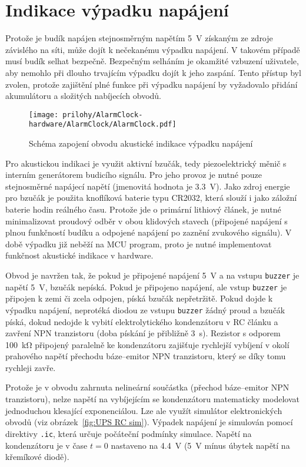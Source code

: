 \section{Indikace výpadku napájení}
Protože je budík napájen stejnosměrným napětím \SI{5}{\volt} získaným ze zdroje
závislého na síti, může dojít k nečekanému výpadku napájení. V takovém případě
musí budík selhat bezpečně. Bezpečným selháním je okamžité vzbuzení uživatele,
aby nemohlo při dlouho trvajícím výpadku dojít k jeho zaspání. Tento přístup
byl zvolen, protože zajištění plné funkce při výpadku napájení by vyžadovalo
přidání akumulátoru a složitých nabíjecích obvodů.

\begin{figure}
    \centering
    \texttt{[image: prilohy/AlarmClock-hardware/AlarmClock/AlarmClock.pdf]}
    \par\bigskip
    \caption{Schéma zapojení obvodu akustické indikace výpadku napájení}
    \label{fig:UPS sch}
\end{figure}

Pro akustickou indikaci je využit aktivní bzučák, tedy piezoelektrický měnič
s interním generátorem budicího signálu. Pro jeho provoz je nutné pouze
stejnosměrné napájecí napětí (jmenovitá hodnota je \SI{3,3}{\volt}).
Jako zdroj energie pro bzučák je použita knoflíková baterie typu CR2032, která
slouží i jako záložní baterie hodin reálného času. Protože jde o primární
lithiový článek, je nutné minimalizovat proudový odběr v obou klidových
stavech (připojené napájení s plnou funkčností budíku a odpojené napájení po
zaznění zvukového signálu). V době výpadku již neběží na \acs{MCU} program,
proto je nutné implementovat funkčnost akustické indikace v hardware.

Obvod je navržen tak, že pokud je připojené napájení \SI{5}{\volt} a na vstupu
\texttt{buzzer} je napětí \SI{5}{\volt}, bzučák nepíská. Pokud je připojeno
napájení, ale vstup \texttt{buzzer} je připojen k zemi či zcela odpojen, píská
bzučák nepřetržitě. Pokud dojde k výpadku napájení, neprotéká diodou ze vstupu
\texttt{buzzer} žádný proud a bzučák píská, dokud nedojde k vybití
elektrolytického kondenzátoru v RC článku a zavření NPN tranzistoru (doba
pískání je přibližně \SI{3}{\second}). Rezistor s odporem \SI{100}{\kilo\ohm}
připojený paralelně ke kondenzátoru zajišťuje rychlejší vybíjení v okolí
prahového napětí přechodu báze--emitor NPN tranzistoru, který se díky tomu
rychleji zavře.

Protože je v obvodu zahrnuta nelineární součástka (přechod báze--emitor NPN
tranzistoru), nelze napětí na vybíjejícím se kondenzátoru matematicky modelovat
jednoduchou klesající exponenciálou. Lze ale využít simulátor elektronických
obvodů (viz obrázek~\vref{fig:UPS RC sim}). Výpadek napájení je simulován
pomocí direktivy \verb|.ic|, která určuje počáteční podmínky simulace. Napětí
na kondenzátoru je v čase $t=0$ nastaveno na \SI{4,4}{\volt} (\SI{5}{\volt}
mínus úbytek napětí na křemíkové diodě).

